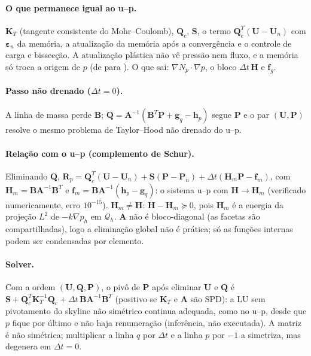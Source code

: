\documentclass[11pt,a4paper]{article}
\newcommand{\cc}[1]{\texttt{\detokenize{#1}}}
\newcommand{\beps}{\boldsymbol{\varepsilon}}\newcommand{\mvec}{\boldsymbol{m}}
\newcommand{\Kt}{\mathbf{K}_T}\newcommand{\Qc}{\mathbf{Q}_c}
\begin{document}
\paragraph{O que permanece igual ao u--p.} $\Kt$ (tangente consistente do Mohr--Coulomb), $\Qc$, $\mathbf S$, o termo
$\Qc^T(\mathbf U-\mathbf U_n)$ com $\beps_n$ da memória, a atualização da memória após a convergência e o controle de carga e
bissecção. A atualização plástica não vê pressão nem fluxo, e a memória só troca a origem de $p$ (de \cc{datavec[1]} para
\cc{datavec[2]}). O que sai: $\nabla N_p\!\cdot\!\nabla p$, o bloco $\Delta t\,\mathbf H$ e $\mathbf f_g$.

\paragraph{Passo não drenado ($\Delta t=0$).} A linha de massa perde $\mathbf B$; $\mathbf Q=\mathbf A^{-1}(\mathbf B^T\mathbf P+\mathbf g_q-\mathbf h_p)$ segue
$\mathbf P$ e o par $(\mathbf U,\mathbf P)$ resolve o mesmo problema de Taylor--Hood não drenado do u--p.

\paragraph{Relação com o u--p (complemento de Schur).} Eliminando $\mathbf Q$,
$\mathbf R_p=\Qc^T(\mathbf U-\mathbf U_n)+\mathbf S(\mathbf P-\mathbf P_n)+\Delta t(\mathbf H_m\mathbf P-\mathbf f_m)$, com
$\mathbf H_m=\mathbf B\mathbf A^{-1}\mathbf B^T$ e $\mathbf f_m=\mathbf B\mathbf A^{-1}(\mathbf h_p-\mathbf g_q)$: o sistema u--p com $\mathbf H\to\mathbf H_m$ (verificado
numericamente, erro $10^{-15}$). $\mathbf H_m\neq\mathbf H$: $\mathbf H-\mathbf H_m\succeq0$, pois $\mathbf H_m$ é a energia da projeção $L^2$ de $-k\nabla p_h$ em $\mathcal Q_h$.
$\mathbf A$ não é bloco-diagonal (as facetas são compartilhadas), logo a eliminação global não é prática; só as funções internas
podem ser condensadas por elemento.

\paragraph{Solver.} Com a ordem $(\mathbf U,\mathbf Q,\mathbf P)$, o pivô de $\mathbf P$ após eliminar $\mathbf U$ e $\mathbf Q$ é
$\mathbf S+\Qc^T\Kt^{-1}\Qc+\Delta t\,\mathbf B\mathbf A^{-1}\mathbf B^T$ (positivo se $\Kt$ e $\mathbf A$ são SPD): a LU sem pivotamento do skyline não
simétrico continua adequada, como no u--p, desde que $p$ fique por último e não haja renumeração (inferência, não executada). A
matriz é não simétrica; multiplicar a linha $q$ por $\Delta t$ e a linha $p$ por $-1$ a simetriza, mas degenera em $\Delta t=0$.
\end{document}
